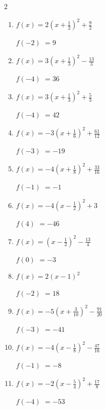 \begin{multicols}{2}
\begin{enumerate}
\columnbreak %

  \item $\displaystyle f(x)=2\left( x+\frac{1}{2}\right)^{2}+\frac{9}{2}$

$f(-2)$
        $=9$

  \item $\displaystyle f(x)=3\left( x+\frac{1}{3}\right)^{2}-\frac{13}{3}$

$f(-4)$
        $=36$

  \item $\displaystyle f(x)=3\left( x+\frac{1}{3}\right)^{2}+\frac{5}{3}$

$f(-4)$
        $=42$

  \item $\displaystyle f(x)=-3\left( x+\frac{1}{6}\right)^{2}+\frac{61}{12}$

$f(-3)$
        $=-19$

  \item $\displaystyle f(x)=-4\left( x+\frac{1}{8}\right)^{2}+\frac{33}{16}$

$f(-1)$
        $=-1$

\columnbreak %

\resetques

  \item $\displaystyle f(x)=-4\left( x-\frac{1}{2}\right)^{2}+3$

$f(4)$
        $=-46$

  \item $\displaystyle f(x)=\left( x-\frac{1}{2}\right)^{2}-\frac{13}{4}$

$f(0)$
        $=-3$

  \item $\displaystyle f(x)=2\left( x-1\right)^{2}$

$f(-2)$
        $=18$

  \item $\displaystyle f(x)=-5\left( x+\frac{3}{10}\right)^{2}-\frac{91}{20}$

$f(-3)$
        $=-41$

  \item $\displaystyle f(x)=-4\left( x-\frac{1}{8}\right)^{2}-\frac{47}{16}$

$f(-1)$
        $=-8$

\columnbreak %

  \item $\displaystyle f(x)=-2\left( x-\frac{5}{4}\right)^{2}+\frac{17}{8}$

$f(-4)$
        $=-53$


\end{enumerate}
\end{multicols}
